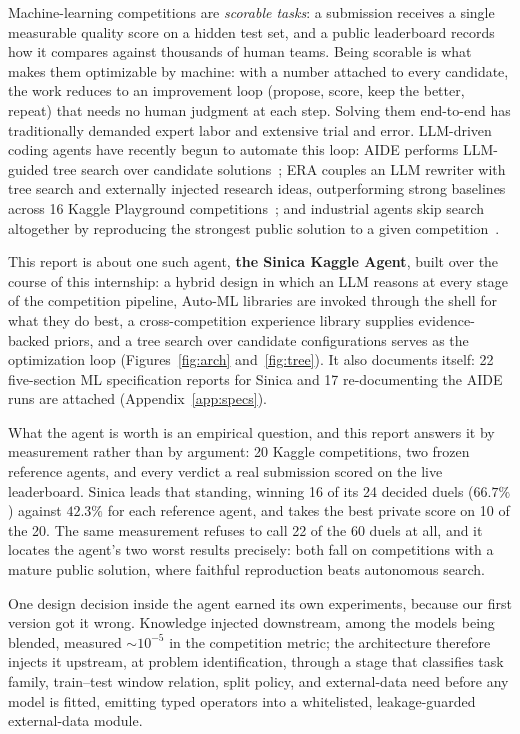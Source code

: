 \documentclass[11pt,a4paper]{article}
\begin{document}
Machine-learning competitions are \emph{scorable tasks}: a submission receives a single measurable quality score on a hidden test set, and a public leaderboard records how it compares against thousands of human teams. Being scorable is what makes them optimizable by machine: with a number attached to every candidate, the work reduces to an improvement loop (propose, score, keep the better, repeat) that needs no human judgment at each step. Solving them end-to-end has traditionally demanded expert labor and extensive trial and error. LLM-driven coding agents have recently begun to automate this loop: AIDE performs LLM-guided tree search over candidate solutions~\cite{aide2025}; ERA couples an LLM rewriter with tree search and externally injected research ideas, outperforming strong baselines across 16 Kaggle Playground competitions~\cite{aygun2026}; and industrial agents skip search altogether by reproducing the strongest public solution to a given competition~\cite{nvidia2026}.

This report is about one such agent, \textbf{the Sinica Kaggle Agent}, built over the course of this internship: a hybrid design in which an LLM reasons at every stage of the competition pipeline, Auto-ML libraries are invoked through the shell for what they do best, a cross-competition experience library supplies evidence-backed priors, and a tree search over candidate configurations serves as the optimization loop (Figures~\ref{fig:arch} and~\ref{fig:tree}). It also documents itself: 22 five-section ML specification reports for Sinica and 17 re-documenting the AIDE runs are attached (Appendix~\ref{app:specs}).

What the agent is worth is an empirical question, and this report answers it by measurement rather than by argument: 20 Kaggle competitions, two frozen reference agents, and every verdict a real submission scored on the live leaderboard. Sinica leads that standing, winning 16 of its 24 decided duels ($66.7\%$) against $42.3\%$ for each reference agent, and takes the best private score on 10 of the 20. The same measurement refuses to call 22 of the 60 duels at all, and it locates the agent's two worst results precisely: both fall on competitions with a mature public solution, where faithful reproduction beats autonomous search.

One design decision inside the agent earned its own experiments, because our first version got it wrong. Knowledge injected downstream, among the models being blended, measured ${\sim}10^{-5}$ in the competition metric; the architecture therefore injects it upstream, at problem identification, through a stage that classifies task family, train--test window relation, split policy, and external-data need before any model is fitted, emitting typed operators into a whitelisted, leakage-guarded external-data module.
\end{document}
